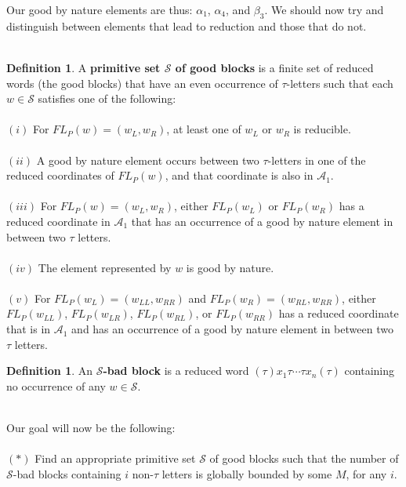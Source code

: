 \documentclass[11pt]{amsart}
\theoremstyle{definition}
\newtheorem{definition}[theorem]{Definition}
\theoremstyle{remark}
\numberwithin{equation}{section}
\begin{document}
\vspace{10mm}
Our good by nature elements are thus: $\alpha_{1}$, $\alpha_{4}$, and $\beta_{3}$. We should now try and distinguish between elements that lead to reduction and those that do not.  \\ \\
\begin{definition}
\label{primitive}
A \textbf{primitive set $\mathcal{S}$ of good blocks} is a finite set of reduced words (the good blocks) that have an even occurrence of $\tau$-letters such that each $w \in \mathcal{S}$ satisfies one of the following: \\ \\
$(i)$ For $FL_{P}(w) = (w_{L},w_{R})$, at least one of $w_{L}$ or $w_{R}$ is reducible. \\ \\
$(ii)$ A good by nature element occurs between two $\tau$-letters in one of the reduced coordinates of $FL_{P}(w)$, and that coordinate is also in $\mathcal{A}_1$. \\ \\
$(iii)$ For $FL_{P}(w) = (w_{L}, w_{R})$, either $FL_{P}(w_{L})$ or $FL_{P}(w_{R})$ has a reduced coordinate in $\mathcal{A}_1$ that has an occurrence of a good by nature element in between two $\tau$ letters. \\ \\
$(iv)$ The element represented by $w$ is good by nature. \\ \\
$(v)$ For $FL_{P}(w_L) = (w_{LL}, w_{RR})$ and $FL_{P}(w_R) = (w_{RL},w_{RR})$, either $FL_{P}(w_{LL})$, $FL_{P}(w_{LR})$, $FL_{P}(w_{RL})$, or $FL_{P}(w_{RR})$  has a reduced coordinate that is in $\mathcal{A}_1$ and has an occurrence of a good by nature element in between two $\tau$ letters.
\end{definition}
\begin{definition}
An \textbf{$\mathcal{S}$-bad block} is a reduced word $(\tau) x_{1} \tau \cdots \tau x_{n} (\tau)$ containing no occurrence of any $w \in \mathcal{S}$. \\ \\
\end{definition}
\noindent Our goal will now be the following: \\ \\
$(*)$ Find an appropriate primitive set $\mathcal{S}$ of good blocks such that the number of $\mathcal{S}$-bad blocks containing $i$ non-$\tau$ letters is globally bounded by some $M$, for any $i$. \\ \\
\end{document}
